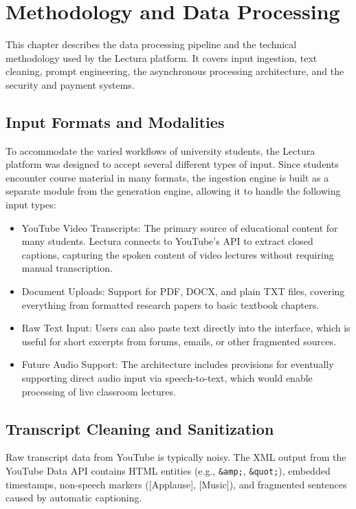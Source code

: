 \chapter{Methodology and Data Processing}
\label{chap:methodology}

This chapter describes the data processing pipeline and the technical methodology used by the Lectura platform. It covers input ingestion, text cleaning, prompt engineering, the asynchronous processing architecture, and the security and payment systems.

\section{Input Formats and Modalities}
To accommodate the varied workflows of university students, the Lectura platform was designed to accept several different types of input. Since students encounter course material in many formats, the ingestion engine is built as a separate module from the generation engine, allowing it to handle the following input types:

\begin{itemize}[label=\textendash]
    \item YouTube Video Transcripts: The primary source of educational content for many students. Lectura connects to YouTube's API to extract closed captions, capturing the spoken content of video lectures without requiring manual transcription.
    \item Document Uploads: Support for PDF, DOCX, and plain TXT files, covering everything from formatted research papers to basic textbook chapters.
    \item Raw Text Input: Users can also paste text directly into the interface, which is useful for short excerpts from forums, emails, or other fragmented sources.
    \item Future Audio Support: The architecture includes provisions for eventually supporting direct audio input via speech-to-text, which would enable processing of live classroom lectures.
\end{itemize}

\section{Transcript Cleaning and Sanitization}
Raw transcript data from YouTube is typically noisy. The XML output from the YouTube Data API contains HTML entities (e.g., \verb|&amp;|, \verb|&quot;|), embedded timestamps, non-speech markers ([Applause], [Music]), and fragmented sentences caused by automatic captioning.

